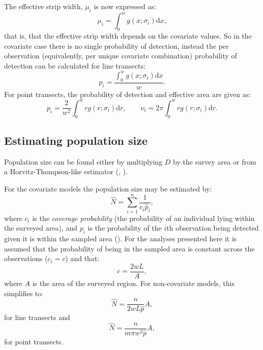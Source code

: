 The effective strip width, $\mu_i$ is now expressed as:
\begin{equation}
\mu_i = \int_0^w g(x ; \sigma_i) \text{d}x,
\label{intro-ds-mu-covar}
\end{equation}
that is, that the effective strip width depends on the covariate values. So in the covariate case there is no single probability of detection, instead the per observation (equivalently, per unique covariate combination) probability of detection can be calculated for line transects:
\begin{equation*}
p_i = \frac{\int_0^w g(x ; \sigma_{i}) \text{d}x}{w}.
\end{equation*}
For point transects, the probability of detection and effective area are given as:
\begin{equation*}
p_i =\frac{2}{w^2}\int_0^w r g(r; \sigma_i) \text{d}r, \qquad \nu_i = 2\pi \int_0^w r g(r; \sigma_i) \text{d}r.
\end{equation*}
\label{cor-7s11}

\subsection{Estimating population size}
\label{intro-ds-pop-size}
\label{cor-r61}

Population size can be found either by multiplying $D$ by the survey area or from a Horvitz-Thompson-like estimator (\cite[pp. 53-56]{thompson}, \cite[p. 23]{ADS}).

For the covariate models the population size may be estimated by:
\begin{equation}
\hat{N} = \sum_{i=1}^n \frac{1}{c_i \hat{p}_i},
\label{HT-ds-est}
\end{equation}
where $c_i$ is the \textit{coverage probability} (the probability of an individual lying within the surveyed area), and $p_i$ is the probability of the $i\text{th}$ observation being detected given it is within the sampled area (\cite[p. 7 and 38]{ADS}). For the analyses presented here it is assumed that the probability of being in the sampled area is constant across the observations ($c_i=c$) and that:
\begin{equation*}
c=\frac{2wL}{A},
\end{equation*}
where $A$ is the area of the surveyed region. For non-covariate models, this simplifies to:
\begin{equation*}
\hat{N} =  \frac{n}{2 w L \hat{p}}A,
\end{equation*}
for line transects and
\begin{equation*}
\hat{N} =  \frac{n}{m \pi w^2 \hat{p}}A,
\end{equation*}
for point transects.

